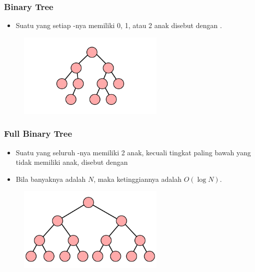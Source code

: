 \begin{frame}
\frametitle{Binary Tree}
\begin{itemize}
  \item Suatu  yang setiap \fnode-nya memiliki 0, 1, atau 2 anak disebut dengan .
\end{itemize}
\begin{figure}
  \includegraphics[width=7cm]{asset/binary-tree.pdf}
\end{figure}
\end{frame}

\begin{frame}
\frametitle{Full Binary Tree}
\begin{itemize}
  \item Suatu  yang seluruh \fnode-nya memiliki 2 anak, kecuali tingkat paling bawah yang tidak memiliki anak, disebut dengan 
  \item Bila banyaknya \fnode adalah $N$, maka ketinggiannya adalah $O(\log{N})$.
\end{itemize}
\begin{figure}
  \includegraphics[width=7cm]{asset/full-binary-tree.pdf}
\end{figure}
\end{frame}

